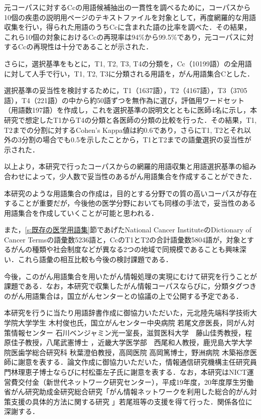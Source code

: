 \documentclass[japanese]{jnlp_1.4}
\begin{document}
元コーパスに対するCcの用語候補抽出の一貫性を調べるために，コーパスから10個の疾患の説明用ページのテキストファイルを対象として，再度網羅的な用語収集を行い，得られた用語のうちCcに含まれた語の比率を調べた．その結果，これら10個の対象におけるCcの再現率は94\%から99.5\%であり，元コーパスに対するCcの再現性は十分であることが示された．

さらに，選択基準をもとに，T1, T2, T3, T4の分類を，Cc（10199語）の全用語に対して人手で行い，T1, T2, T3に分類される用語を，がん用語集合Cとした．

選択基準の妥当性を検討するために，T1（1637語），T2（4167語），T3（3705語），T4（221語）の中から約50語ずつを無作為に選び，評価用ワードセット（用語数197語）を作成し，これを選択基準の説明文とともに医師4名に示し，本研究で想定したT1からT4の分類と各医師の分類の比較を行った．その結果，T1, T2までの分割に対するCohen's Kappa値は約0.6であり，さらにT1, T2とそれ以外の3分割の場合でも0.5を示したことから，T1とT2までの語彙選択の妥当性が示された．

以上より，本研究で行ったコーパスからの網羅的用語収集と用語選択基準の組み合わせによって，少人数で妥当性のあるがん用語集合を作成することができた．

本研究のような用語集合の作成は，目的とする分野での質の高いコーパスが存在することが重要だが，今後他の医学分野においても同様の手法で，妥当性のある用語集合を作成していくことが可能と思われる．

また，\ref{s:既存の医学用語集}節であげたNational Cancer InstituteのDictionary of Cancer Termsの語彙数5236語と，CcのT1とT2の合計語彙数5804語が，対象とするがんの種類や社会制度などが異なる2つの地域で同規模であることも興味深い．これら語彙の相互比較も今後の検討課題である．

今後，このがん用語集合を用いたがん情報処理の実現にむけて研究を行うことが課題である．なお，本研究で収集したがん情報コーパスならびに，分類タグつきのがん用語集合は，国立がんセンターとの協議の上で公開する予定である．


\acknowledgment
本研究を行うに当たり用語辞書作成に御協力いただいた，元北陸先端科学技術大学院大学学生 木村俊也氏，国立がんセンター中央病院 若尾文彦医長，同がん対策情報センター 石川ベンジャミン光一室長，滋賀医科大学　藤山佳秀教授，程原佳子教授，八尾武憲博士 ，近畿大学医学部　西尾和人教授，鹿児島大学大学院医歯学総合研究科  秋葉澄伯教授，高岡医院 高岡篤博士，野洲病院 木築裕彦医師に謝意を表する．論文作成に御協力いただいた，情報通信研究機構主任研究員　門林理恵子博士ならびに村松亜左子氏に謝意を表する．なお，本研究はNICT運営費交付金（新世代ネットワーク研究センター），平成19年度，20年度厚生労働省がん研究助成金研究総合研究「がん情報ネットワークを利用した総合的がん対策支援の具体的方法に関する研究 」若尾班等の支援を得て行った．関係各位に深謝する．
\end{document}
